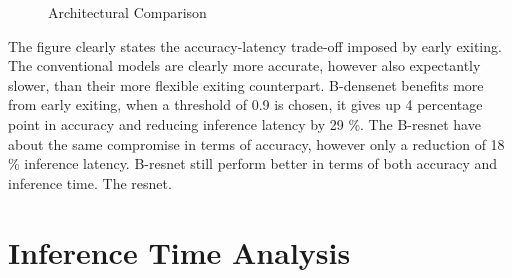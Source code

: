   \begin{figure}
	\captionsetup[subfigure]{justification=centering}
	\centering
	\caption[Architectural Comparison]{Architectural Comparison}
\end{figure}

The figure clearly states the accuracy-latency trade-off imposed by early exiting. The conventional models are clearly more accurate, however also expectantly slower, than their more flexible exiting counterpart. B-\gls{densenet} benefits more from early exiting, when a threshold of 0.9 is chosen, it gives up 4 percentage point in accuracy and reducing inference latency by 29 \%. The B-\gls{resnet} have about the same compromise in terms of accuracy, however only a reduction of 18 \% inference latency. B-\gls{resnet} still perform better in terms of both accuracy and inference time. The \gls{resnet}. 

\section{Inference Time Analysis}

